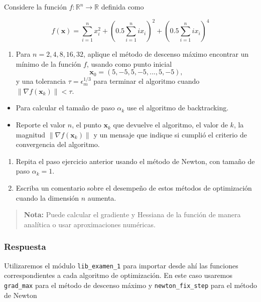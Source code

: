 \documentclass[11pt]{article}
\providecommand{\tightlist}{%
      \setlength{\itemsep}{0pt}\setlength{\parskip}{0pt}}
\begin{document}
Considere la función \(f: \mathbb{R}^n \rightarrow \mathbb{R}\) definida
como

\[ f(\mathbf{x}) = \sum_{i=1}^n x_i^2  
+ \left(0.5 \sum_{i=1}^n i x_i  \right)^2
+ \left(0.5 \sum_{i=1}^n i x_i  \right)^4
\]

\begin{enumerate}
\def\labelenumi{\arabic{enumi}.}
\tightlist
\item
  Para \(n=2, 4, 8, 16, 32\), aplique el método de descenso máximo
  encontrar un mínimo de la función \(f\), usando como punto inicial
  \[ \mathbf{x}_0 = (5, -5, 5, -5, ..., 5, -5), \] y una tolerancia
  \(\tau = \epsilon_m^{1/3}\) para terminar el algoritmo cuando
  \(\|\nabla f(\mathbf{x}_k)\|<\tau\).
\end{enumerate}

\begin{itemize}
\tightlist
\item
  Para calcular el tamaño de paso \(\alpha_k\) use el algoritmo de
  backtracking.
\item
  Reporte el valor \(n\), el punto \(\mathbf{x}_k\) que devuelve el
  algoritmo, el valor de \(k\), la magnitud
  \(\|\nabla f(\mathbf{x}_k)\|\) y un mensaje que indique si cumplió el
  criterio de convergencia del algoritmo.
\end{itemize}

\begin{enumerate}
\def\labelenumi{\arabic{enumi}.}
\setcounter{enumi}{1}
\item
  Repita el paso ejercicio anterior usando el método de Newton, con
  tamaño de paso \(\alpha_k=1\).
\item
  Escriba un comentario sobre el desempeño de estos métodos de
  optimización cuando la dimensión \(n\) aumenta.
\end{enumerate}

\begin{quote}
\textbf{Nota:} Puede calcular el gradiente y Hessiana de la función de
manera analítica o usar aproximaciones numéricas.
\end{quote}

\hypertarget{respuesta}{%
\subsubsection{Respuesta}\label{respuesta}}

    Utilizaremos el módulo \texttt{lib\_examen\_1} para importar desde ahí
las funciones correspondientes a cada algoritmo de optimización. En este
caso usaremos \texttt{grad\_max} para el método de descenso máximo y
\texttt{newton\_fix\_step} para el método de Newton
\end{document}
